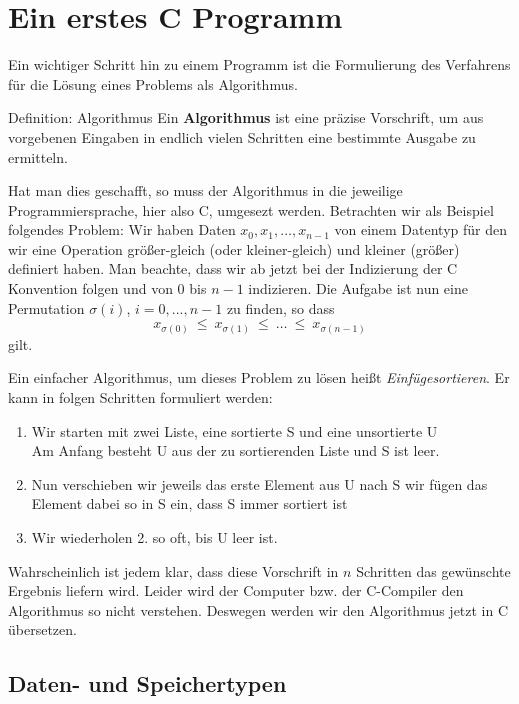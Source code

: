 \section{Ein erstes C Programm}

Ein wichtiger Schritt hin zu einem Programm ist die Formulierung des
Verfahrens für die Lösung eines Problems als Algorithmus.
\begin{myblock}{Definition: Algorithmus}
Ein \textbf{Algorithmus} ist eine präzise Vorschrift, um aus vorgebenen
Eingaben in endlich vielen Schritten eine bestimmte Ausgabe zu
ermitteln.
\end{myblock}

Hat man dies geschafft, so muss der Algorithmus in die jeweilige Programmiersprache, hier also C, umgesezt werden.
Betrachten wir als Beispiel folgendes Problem:
Wir haben Daten $x_0, x_1,\ldots,x_{n-1}$ von einem Datentyp für den wir eine Operation größer-gleich (oder kleiner-gleich) und kleiner (größer) definiert haben.
Man beachte, dass wir ab jetzt bei der Indizierung der C Konvention folgen und von $0$ bis $n-1$ indizieren.
Die Aufgabe ist nun eine Permutation $\sigma(i)$, $i=0,...,n-1$ zu finden, so dass
\[
x_{\sigma(0)}\ \leq\ x_{\sigma(1)}\ \leq\ \ldots\ \leq\ x_{\sigma(n-1)}
\]
gilt.

Ein einfacher Algorithmus, um dieses Problem zu lösen heißt \emph{Einfügesortieren}.
Er kann in folgen Schritten formuliert werden:
\begin{enumerate}
\item Wir starten mit zwei Liste, eine sortierte S und eine unsortierte U\\
  Am Anfang besteht U aus der zu sortierenden Liste und S ist leer.
\item Nun verschieben wir jeweils das erste Element aus U nach S
  wir fügen das Element dabei so in S ein, dass S immer sortiert ist
 \item Wir wiederholen 2. so oft, bis U leer ist.
\end{enumerate}
Wahrscheinlich ist jedem klar, dass diese Vorschrift in $n$ Schritten das gewünschte Ergebnis liefern wird.
Leider wird der Computer bzw. der C-Compiler den Algorithmus so nicht verstehen.
Deswegen werden wir den Algorithmus jetzt in C übersetzen.

\subsection{Daten- und Speichertypen}

